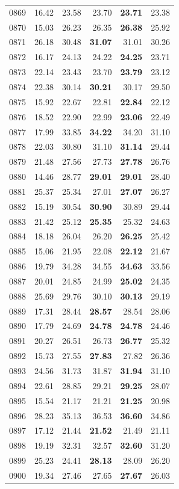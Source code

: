\documentclass[12pt,a4paper,oneside]{NITR}
\begin{document}
{\begin{longtable}{@{}lrrrrr@{}}
0869 & 16.42 & 23.58 & 23.70 & \textbf{23.71} & 23.38 \\
0870 & 15.03 & 26.23 & 26.35 & \textbf{26.38} & 25.92 \\
0871 & 26.18 & 30.48 & \textbf{31.07} & 31.01 & 30.26 \\
0872 & 16.17 & 24.13 & 24.22 & \textbf{24.25} & 23.71 \\
0873 & 22.14 & 23.43 & 23.70 & \textbf{23.79} & 23.12 \\
0874 & 22.38 & 30.14 & \textbf{30.21} & 30.17 & 29.50 \\
0875 & 15.92 & 22.67 & 22.81 & \textbf{22.84} & 22.12 \\
0876 & 18.52 & 22.90 & 22.99 & \textbf{23.06} & 22.49 \\
0877 & 17.99 & 33.85 & \textbf{34.22} & 34.20 & 31.10 \\
0878 & 22.03 & 30.80 & 31.10 & \textbf{31.14} & 29.44 \\
0879 & 21.48 & 27.56 & 27.73 & \textbf{27.78} & 26.76 \\
0880 & 14.46 & 28.77 & \textbf{29.01} & \textbf{29.01} & 28.40 \\
0881 & 25.37 & 25.34 & 27.01 & \textbf{27.07} & 26.27 \\
0882 & 15.19 & 30.54 & \textbf{30.90} & 30.89 & 29.44 \\
0883 & 21.42 & 25.12 & \textbf{25.35} & 25.32 & 24.63 \\
0884 & 18.18 & 26.04 & 26.20 & \textbf{26.25} & 25.42 \\
0885 & 15.06 & 21.95 & 22.08 & \textbf{22.12} & 21.67 \\
0886 & 19.79 & 34.28 & 34.55 & \textbf{34.63} & 33.56 \\
0887 & 20.01 & 24.85 & 24.99 & \textbf{25.02} & 24.35 \\
0888 & 25.69 & 29.76 & 30.10 & \textbf{30.13} & 29.19 \\
0889 & 17.31 & 28.44 & \textbf{28.57} & 28.54 & 28.06 \\
0890 & 17.79 & 24.69 & \textbf{24.78} & \textbf{24.78} & 24.46 \\
0891 & 20.27 & 26.51 & 26.73 & \textbf{26.77} & 25.32 \\
0892 & 15.73 & 27.55 & \textbf{27.83} & 27.82 & 26.36 \\
0893 & 24.56 & 31.73 & 31.87 & \textbf{31.94} & 31.10 \\
0894 & 22.61 & 28.85 & 29.21 & \textbf{29.25} & 28.07 \\
0895 & 15.54 & 21.17 & 21.21 & \textbf{21.25} & 20.98 \\
0896 & 28.23 & 35.13 & 36.53 & \textbf{36.60} & 34.86 \\
0897 & 17.12 & 21.44 & \textbf{21.52} & 21.49 & 21.11 \\
0898 & 19.19 & 32.31 & 32.57 & \textbf{32.60} & 31.20 \\
0899 & 25.23 & 24.41 & \textbf{28.13} & 28.09 & 26.20 \\
0900 & 19.34 & 27.46 & 27.65 & \textbf{27.67} & 26.03 \\


\end{longtable}
}
\end{document}
